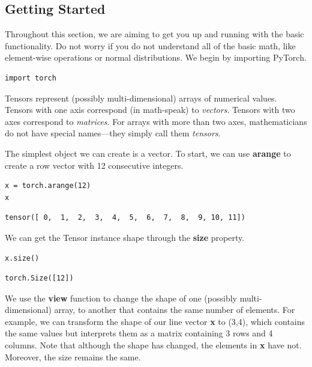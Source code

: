 \documentclass[]{article}
\begin{document}
\subsection{Getting Started}

Throughout this section, we are aiming to get you up and running with the basic functionality. Do not worry if you do not understand all of the basic math, like element-wise operations or normal distributions. We begin by importing PyTorch.

\begin{verbatim}
import torch
\end{verbatim}

Tensors represent (possibly multi-dimensional) arrays of numerical values. Tensors with one axis correspond (in math-speak) to \textit{vectors}. Tensors with two axes correspond to \textit{matrices}. For arrays with more than two axes, mathematicians do not have special names—they simply call them \textit{tensors}.

The simplest object we can create is a vector. To start, we can use \textbf{arange} to create a row vector with 12 consecutive integers.

\begin{verbatim}
x = torch.arange(12)
x
\end{verbatim}

\begin{verbatim}
tensor([ 0,  1,  2,  3,  4,  5,  6,  7,  8,  9, 10, 11])
\end{verbatim}

We can get the Tensor instance shape through the \textbf{size} property.

\begin{verbatim}
x.size()
\end{verbatim}

\begin{verbatim}
torch.Size([12])
\end{verbatim}

We use the \textbf{view} function to change the shape of one (possibly multi-dimensional) array, to another that contains the same number of elements. For example, we can transform the shape of our line vector \textbf{x} to (3,4), which contains the same values but interprets them as a matrix containing 3 rows and 4 columns. Note that although the shape has changed, the elements in \textbf{x} have not. Moreover, the size remains the same.
\end{document}
